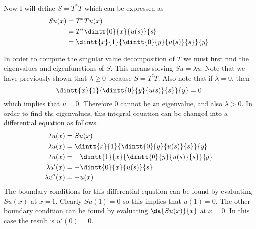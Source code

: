 \documentclass[11pt, oneside]{article}
\begin{document}
\begin{enumerate}
    Now I will define $S = T^* T$ which can be expressed as
    \begin{align*}
      Su(x) &= T^* T u(x) \\
      &= T^* \dintt{0}{x}{u(s)}{s} \\
      &= \dintt{x}{1}{\dintt{0}{y}{u(s)}{s}}{y}
    \end{align*}

    In order to compute the singular value decomposition of $T$ we must first
    find the eigenvalues and eigenfunctions of $S$.
    This means solving $Su = \lambda u$.
    Note that we have previously shown that $\lambda \ge 0$ because $S = T^* T$.
    Also note that if $\lambda = 0$, then
    \[
      \dintt{x}{1}{\dintt{0}{y}{u(s)}{s}}{y} = 0
    \]
    which implies that $u = 0$.
    Therefore 0 cannot be an eigenvalue, and also $\lambda > 0$.
    In order to find the eigenvalues, this integral equation can be changed into
    a differential equation as follows.
    \begin{align*}
      \lambda u(x) &= Su(x) \\
      \lambda u(x) &= \dintt{x}{1}{\dintt{0}{y}{u(s)}{s}}{y} \\
      \lambda u(x) &= -\dintt{1}{x}{\dintt{0}{y}{u(s)}{s}}{y} \\
      \lambda u'(x) &= -\dintt{0}{x}{u(s)}{s} \\
      \lambda u''(x) &= -u(x) \\
    \end{align*}
    The boundary conditions for this differential equation can be found by
    evaluating $Su(x)$ at $x = 1$.
    Clearly $Su(1) = 0$ so this implies that $u(1) = 0$.
    The other boundary condition can be found by evaluating $\da{Su(x)}{x}$
    at $x = 0$.
    In this case the result is $u'(0) = 0$.


\end{enumerate}
\end{document}
